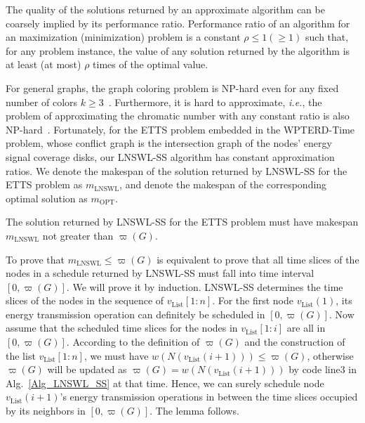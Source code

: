 \documentclass[journal,10pt]{IEEEtran}
\begin{document}
The quality of the solutions returned by an approximate algorithm can be coarsely implied by its performance ratio. Performance ratio of an algorithm for an maximization (minimization) problem is a constant $\rho{\leq}1({\geq}1)$ such that, for any problem instance, the value of any solution returned by the algorithm is at least (at most) ${\rho}$ times of the optimal value.

For general graphs, the graph coloring problem is NP-hard even for any fixed number of colors $k{\geq}3$~\cite{Garey1979}. Furthermore, it is hard to approximate, \textit{i.e.}, the problem of approximating the chromatic number with any constant ratio is also NP-hard~\cite{Arora1998}. Fortunately, for the ETTS problem embedded in the WPTERD-Time problem, whose conflict graph is the intersection graph of the nodes' energy signal coverage disks, our LNSWL-SS algorithm has constant approximation ratios. We denote the makespan of the solution returned by LNSWL-SS for the ETTS problem as $m_\text{LNSWL}$, and denote the makespan of the corresponding optimal solution as $m_\text{OPT}$.

\begin{lemma}
\label{lemma_valid_solution}
The solution returned by LNSWL-SS for the ETTS problem must have makespan $m_\text{LNSWL}$ not greater than $\varpi(G)$.
\end{lemma}

\begin{IEEEproof}
To prove that $m_\text{LNSWL}{\leq}\varpi(G)$ is equivalent to prove that all time slices of the nodes in a schedule returned by LNSWL-SS must fall into time interval $[0,\varpi(G)]$. We will prove it by induction. LNSWL-SS determines the time slices of the nodes in the sequence of $v_\text{List}[1{:}n]$. For the first node $v_\text{List}(1)$, its energy transmission operation can definitely be scheduled in $[0,\varpi(G)]$. Now assume that the scheduled time slices for the nodes in $v_\text{List}[1{:}i]$ are all in $[0,\varpi(G)]$. According to the definition of $\varpi(G)$ and the construction of the list $v_\text{List}[1{:}n]$, we must have $w(N(v_\text{List}(i{+}1))){\leq}\varpi(G)$, otherwise $\varpi(G)$ will be updated as $\varpi(G){=}w(N(v_\text{List}(i{+}1)))$ by code line3 in Alg.~\ref{Alg_LNSWL_SS} at that time. Hence, we can surely schedule node $v_\text{List}(i{+}1)$'s energy transmission operations in between the time slices occupied by its neighbors in $[0,\varpi(G)]$. The lemma follows.
\end{IEEEproof}
\end{document}
